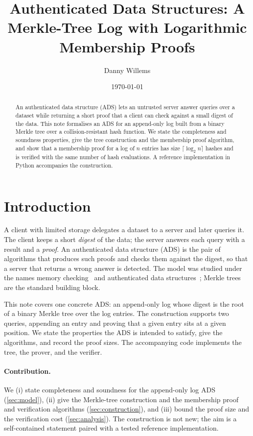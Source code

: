 \documentclass[11pt]{article}
\title{Authenticated Data Structures: A Merkle-Tree Log with
  Logarithmic Membership Proofs}
\author{Danny Willems}
\date{\today}
\theoremstyle{plain}
\theoremstyle{definition}
\theoremstyle{remark}
\begin{document}
\maketitle

\begin{abstract}
An authenticated data structure (ADS) lets an untrusted server answer
queries over a dataset while returning a short proof that a client can
check against a small digest of the data. This note formalises an ADS
for an append-only log built from a binary Merkle tree over a
collision-resistant hash function. We state the completeness and
soundness properties, give the tree construction and the membership
proof algorithm, and show that a membership proof for a log of $n$
entries has size $\lceil \log_2 n \rceil$ hashes and is verified with
the same number of hash evaluations. A reference implementation in
Python accompanies the construction.
\end{abstract}

\section{Introduction}
\label{sec:intro}

A client with limited storage delegates a dataset to a server and later
queries it. The client keeps a short \emph{digest} of the data; the
server answers each query with a result and a \emph{proof}. An
authenticated data structure (ADS) is the pair of algorithms that
produces such proofs and checks them against the digest, so that a
server that returns a wrong answer is detected. The model was studied
under the names memory checking~\cite{BEGKN94} and authenticated data
structures~\cite{Tamassia03}; Merkle trees~\cite{Merkle88} are the
standard building block.

This note covers one concrete ADS: an append-only log whose digest is
the root of a binary Merkle tree over the log entries. The construction
supports two queries, appending an entry and proving that a given entry
sits at a given position. We state the properties the ADS is intended to
satisfy, give the algorithms, and record the proof sizes. The accompanying
code implements the tree, the prover, and the verifier.

\paragraph{Contribution.}
We (i) state completeness and soundness for the append-only log ADS
(\cref{sec:model}), (ii) give the Merkle-tree construction and the
membership proof and verification algorithms (\cref{sec:construction}),
and (iii) bound the proof size and the verification cost
(\cref{sec:analysis}). The construction is not new; the aim is a
self-contained statement paired with a tested reference implementation.
\end{document}
